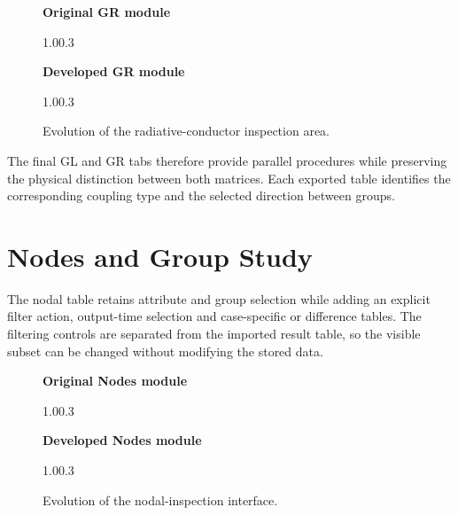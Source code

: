 \begin{figure}[H]
    \centering
    \textbf{Original GR module}\par\vspace{0.2em}
        {1.0\textwidth}{0.3\textheight}

    \vspace{1em}
    \textbf{Developed GR module}\par\vspace{0.2em}
        {1.0\textwidth}{0.3\textheight}

    \caption{Evolution of the radiative-conductor inspection area.}
    \label{fig:appendix_gr_conductors_evolution}
\end{figure}

The final GL and GR tabs therefore provide parallel procedures while preserving
the physical distinction between both matrices. Each exported table identifies
the corresponding coupling type and the selected direction between groups.

\section{Nodes and Group Study}
\label{appsec:nodes_group_study_evolution}

The nodal table retains attribute and group selection while adding an explicit
filter action, output-time selection and case-specific or difference tables.
The filtering controls are separated from the imported result table, so the
visible subset can be changed without modifying the stored data.

\begin{figure}[H]
    \centering
    \textbf{Original Nodes module}\par\vspace{0.2em}
        {1.0\textwidth}{0.3\textheight}

    \vspace{1em}
    \textbf{Developed Nodes module}\par\vspace{0.2em}
        {1.0\textwidth}{0.3\textheight}

    \caption{Evolution of the nodal-inspection interface.}
    \label{fig:appendix_nodes_evolution}
\end{figure}

